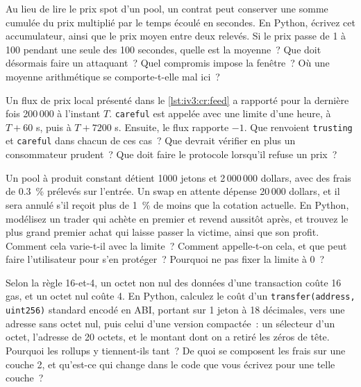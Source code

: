 \begin{question}\label{iq:iv3:smart-contracts-and-crypto-engineering:16}
Au lieu de lire le prix spot d'un pool, un contrat peut conserver une somme cumulée du prix multiplié par le temps écoulé en secondes. En Python, écrivez cet accumulateur, ainsi que le prix moyen entre deux relevés. Si le prix passe de 1 à 100 pendant une seule des 100 secondes, quelle est la moyenne~? Que doit désormais faire un attaquant~? Quel compromis impose la fenêtre~? Où une moyenne arithmétique se comporte-t-elle mal ici~?
\end{question}

\begin{question}\label{iq:iv3:smart-contracts-and-crypto-engineering:17}
Un flux de prix local présenté dans le \cref{lst:iv3:cr:feed} a rapporté pour la dernière fois 200\,000 à l'instant $T$. \texttt{careful} est appelée avec une limite d'une heure, à $T + 60$ s, puis à $T + 7200$ s. Ensuite, le flux rapporte $-1$. Que renvoient \texttt{trusting} et \texttt{careful} dans chacun de ces cas~? Que devrait vérifier en plus un consommateur prudent~? Que doit faire le protocole lorsqu'il refuse un prix~?
\label{lst:iv3:cr:feed}
\end{question}

\begin{question}\label{iq:iv3:smart-contracts-and-crypto-engineering:18}
Un pool à produit constant détient 1000 jetons et 2\,000\,000 dollars, avec des frais de 0.3~\% prélevés sur l'entrée. Un swap en attente dépense 20\,000 dollars, et il sera annulé s'il reçoit plus de 1~\% de moins que la cotation actuelle. En Python, modélisez un trader qui achète en premier et revend aussitôt après, et trouvez le plus grand premier achat qui laisse passer la victime, ainsi que son profit. Comment cela varie-t-il avec la limite~? Comment appelle-t-on cela, et que peut faire l'utilisateur pour s'en protéger~? Pourquoi ne pas fixer la limite à 0~?
\end{question}

\begin{question}\label{iq:iv3:smart-contracts-and-crypto-engineering:19}
Selon la règle 16-et-4, un octet non nul des données d'une transaction coûte 16 gas, et un octet nul coûte 4. En Python, calculez le coût d'un \texttt{transfer(address, uint256)} standard encodé en ABI, portant sur 1 jeton à 18 décimales, vers une adresse sans octet nul, puis celui d'une version compactée~: un sélecteur d'un octet, l'adresse de 20 octets, et le montant dont on a retiré les zéros de tête. Pourquoi les rollups y tiennent-ils tant~? De quoi se composent les frais sur une couche 2, et qu'est-ce qui change dans le code que vous écrivez pour une telle couche~?
\end{question}

